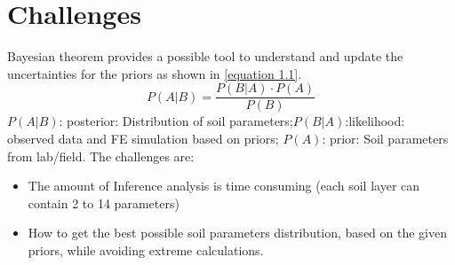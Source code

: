 \section{Challenges}

Bayesian theorem provides a possible tool to understand and update the uncertainties for the priors as shown in \cref{equation 1.1}.
\begin{equation}
P(A|B) = \frac{{P(B|A) \cdot P(A)}}{{P(B)}} \label{equation 1.1}
\end{equation}
$P(A|B)$: posterior: Distribution of soil parameters;$P(B|A)$:likelihood: observed data and FE simulation based on priors; $P(A)$: prior: Soil parameters from lab/field.
The challenges are:

\begin{itemize}
    \item The amount of Inference analysis is time consuming (each soil layer can contain 2 to 14 parameters)
    \item How to get the best possible soil parameters distribution, based on the given priors, while avoiding extreme calculations.

\end{itemize}